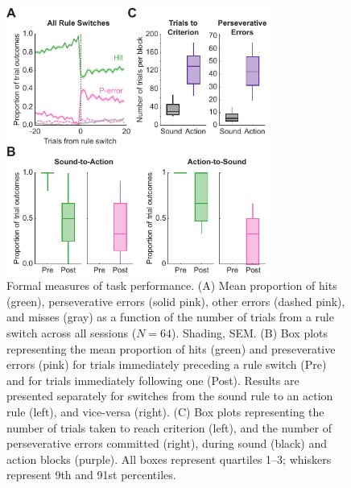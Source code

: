 \begin{figure}[htbp]

\begin{center}
\includegraphics[width=8.7cm]{Figures/Chapter4/Fig3} 
\end{center}

\caption[Formal measures of task performance]
{Formal measures of task performance. (A) Mean proportion of hits (green), perseverative errors (solid pink), other errors (dashed pink), and misses (gray) as a function of the number of trials from a rule switch across all sessions ($N=64$). Shading, SEM. (B) Box plots representing the mean proportion of hits (green) and preseverative errors (pink) for trials immediately preceding a rule switch (Pre) and for trials immediately following one (Post). Results are presented separately for switches from the sound rule to an action rule (left), and vice-versa (right). (C) Box plots representing the number of trials taken to reach criterion (left), and the number of perseverative errors committed (right), during sound (black) and action blocks (purple). All boxes represent quartiles 1--3; whiskers represent 9th and 91st percentiles.}

\label{fig:Fig3}
\end{figure}